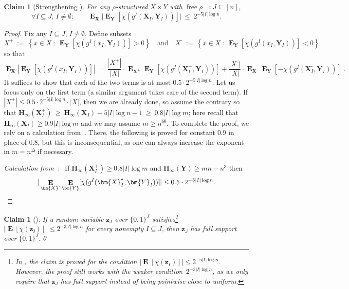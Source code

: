 \documentclass[11pt]{article}
\numberwithin{equation}{section}
\newtheorem{claim}[theorem]{Claim}
\theoremstyle{definition}
\theoremstyle{plain}
\newcommand{\Hmin}{\mathbf{H}_\infty}
\DeclareMathOperator{\Ex}{\mathbf{E}}
\DeclareMathOperator{\free}{free}
\newcommand{\z}{\bm{z}}
\newcommand{\X}{\bm{X}}
\newcommand{\Y}{\bm{Y}}
\newcommand{\set}[1]{\left \{ #1 \right \}}
\newcommand{\bit}{\{0,1\}}
\begin{document}
\begin{claim}[Strengthening {\cite[Lemma 8]{goos17bpp}}] \label{prop:fourier-decay}
For any $\rho$-structured $X \times Y$ with $\free\rho \eqqcolon J \subseteq [n]$,
\[
\forall I\subseteq J,\,I\neq\emptyset:\qquad
\Ex_{\X} \big|\Ex_{\Y}[\chi(g^I(\X_I,\Y_I))]\big| ~\le~ 2^{-5 |I| \log n}.
\]
\end{claim}
\begin{proof}
Fix any $I \subseteq J$, $I\neq\emptyset$. Define subsets
\[
X^{\texttt{+}} ~:=~ \set{x \in X \ : \ \Ex_{\Y} [\chi(g^I(x_I,\Y_I))] > 0} \quad \text{and} \quad X^{\texttt{-}} ~:=~ \set{x \in X \ : \ \Ex_{\Y} [\chi(g^I(x_I,\Y_I))] < 0}
\]
so that
\[
\Ex_{\X} \left | \Ex_{\Y} [\chi(g^I(x_I,\Y_I))] \right |
~=~ \frac{|X^{\texttt{+}}|}{|X|} \cdot \Ex_{\X^{\texttt{+}}} \Ex_{\Y} [\chi(g^I(\X^{\texttt{+}}_I,\Y_I))] + \frac{|X^{\texttt{-}}|}{|X|} \cdot \Ex_{\X^{\texttt{-}}} \Ex_{\Y} [- \chi(g^I(\X^{\texttt{-}}_I,\Y_I))]\;.
\]
It suffices to show that each of the two terms is at most $0.5 \cdot 2^{- 5|I| \log n}$. Let us focus only on the first term (a similar argument takes care of the second term). If $|X^{\texttt{+}}| \le 0.5 \cdot 2^{- 5|I| \log n} \cdot |X|$, then we are already done, so assume the contrary so that $\Hmin(\X^{\texttt{+}}_I) ~\ge~ \Hmin(\X_I) - 5 |I| \log n - 1 ~\ge~ 0.8 |I| \log m$; here recall that $\Hmin(\X_I) \ge 0.9 |I| \log m$ and we may assume $m \geq n^{60}$. To complete the proof, we rely on a calculation from~\cite[Lem.~8]{goos17bpp}. There, the following is proved for constant 0.9 in place of 0.8, but this is inconsequential, as one can always increase the exponent in $m=n^\Delta$ if necessary.

\vspace{1mm}
\noindent \emph{Calculation from}~\cite[Lem.~8, Eq.~4]{goos17bpp}:~ If $\Hmin(\X^{\texttt{+}}_I) \ge 0.8 |I| \log m$ and $\Hmin(\Y) \ge mn - n^3$ then
\[
|\Ex_{\X^{\texttt{+}}} \Ex_{\Y} [\chi(g^I(\X^{\texttt{+}}_I,\Y_I))]| \le 0.5 \cdot 2^{-5|I| \log n}.\qedhere
\]
\end{proof}

\begin{claim}[{\cite[Lem.~9]{goos17bpp}}] \label{prop:uniformity-from-fourier-decay}
If a random variable $\z_J$ over $\bit^J$ satisfies\footnote{In {\cite[\S4.6]{goos17bpp}}, the claim is proved for the condition $|\Ex [\chi(\z_I)]| \le 2^{-5|I| \log n}$. However, the proof still works with the weaker condition~$2^{-3|I| \log n}$, as we only require that $\z_J$ has full support instead of being pointwise-close to uniform.} $|\Ex [\chi(\z_I)]| \le 2^{-3|I| \log n}$ for every nonempty $I \subseteq J$, then $\z_J$ has full support over $\bit^J$.\qed
\end{claim}
\end{document}
